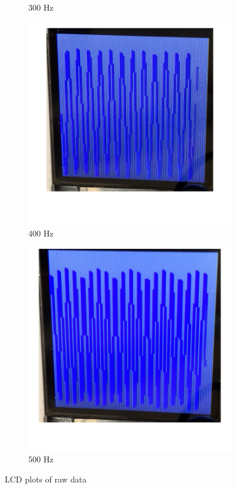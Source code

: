 \documentclass[12pt]{article}
\begin{document}
\begin{figure}[H]
\begin{subfigure}[b]{0.3\textwidth}
    \caption{300 Hz}
    \label{fig:raw_300}
  \end{subfigure}
  \begin{subfigure}[b]{0.3\textwidth}
    \includegraphics[width=\textwidth]{./img/raw_400Hz}
    \caption{400 Hz}
    \label{fig:raw_400}
  \end{subfigure}
  \begin{subfigure}[b]{0.3\textwidth}
    \includegraphics[width=\textwidth]{./img/raw_500Hz}
    \caption{500 Hz}
    \label{fig:raw_500}
  \end{subfigure}
  \caption{LCD plots of raw data}
  \label{fig:lcd-plots-raw}
\end{figure}
\end{document}
